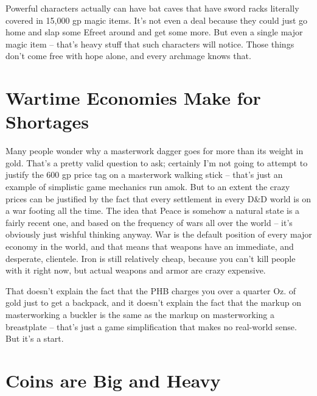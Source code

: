 Powerful characters actually can have bat caves that have sword racks literally covered in 15,000 gp magic items. It's not even a deal because they could just go home and slap some Efreet around and get some more. But even a single major magic item -- that's heavy stuff that such characters will notice. Those things don't come free with hope alone, and every archmage knows that.

\section{Wartime Economies Make for Shortages}

Many people wonder why a masterwork dagger goes for more than its weight in gold. That's a pretty valid question to ask; certainly I'm not going to attempt to justify the 600 gp price tag on a masterwork walking stick -- that's just an example of simplistic game mechanics run amok. But to an extent the crazy prices can be justified by the fact that every settlement in every D\&D world is on a war footing all the time. The idea that Peace is somehow a natural state is a fairly recent one, and based on the frequency of wars all over the world -- it's obviously just wishful thinking anyway. War is the default position of every major economy in the world, and that means that weapons have an immediate, and desperate, clientele. Iron is still relatively cheap, because you can't kill people with it right now, but actual weapons and armor are crazy expensive.

That doesn't explain the fact that the PHB charges you over a quarter Oz. of gold just to get a backpack, and it doesn't explain the fact that the markup on masterworking a buckler is the same as the markup on masterworking a breastplate -- that's just a game simplification that makes no real-world sense. But it's a start.

\section{Coins are Big and Heavy}
\vspace*{-8pt}

